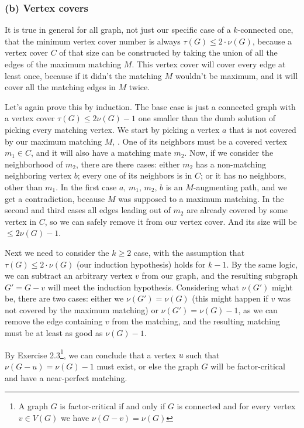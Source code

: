 \documentclass{article}
\begin{document}
  \subsubsection*{(b) Vertex covers}
  It is true in general for all graph, not just our specific case of a $k$-connected one,
  that the minimum vertex cover number is always $\tau(G) \leq 2 \cdot \nu(G)$,
  because a vertex cover $C$ of that size can be constructed by taking the union of all the edges of the maximum matching $M$.
  This vertex cover will cover every edge at least once, because if it didn't the matching $M$ wouldn't be maximum,
  and it will cover all the matching edges in $M$ twice.

  Let's again prove this by induction.
  The base case is just a connected graph with a vertex cover $\tau(G) \leq 2\nu(G) - 1$
  one smaller than the dumb solution of picking every matching vertex.
  We start by picking a vertex $a$ that is not covered by our maximum matching $M$, .
  One of its neighbors must be a covered vertex $m_1 \in C$, and it will also have a matching mate $m_2$.
  Now, if we consider the neighborhood of $m_2$, there are there cases:
  either $m_2$ has a non-matching neighboring vertex $b$;
  every one of its neighbors is in $C$;
  or it has no neighbors, other than $m_1$.
  In the first case $a,\, m_1,\, m_2,\, b$ is an $M$-augmenting path,
  and we get a contradiction, because $M$ was supposed to a maximum matching.
  In the second and third cases all edges leading out of $m_2$ are already covered by some vertex in $C$,
  so we can safely remove it from our vertex cover.
  And its size will be $\leq 2\nu(G) - 1$.

  Next we need to consider the $k \geq 2$ case, with the assumption that
  $\tau(G) \leq 2 \cdot \nu(G)$ (our induction hypothesis) holds for $k-1$.
  By the same logic, we can subtract an arbitrary vertex $v$ from our graph,
  and the resulting subgraph $G' = G - v$ will meet the induction hypothesis.
  Considering what $\nu(G')$ might be, there are two cases:
  either we $\nu(G') = \nu(G)$ (this might happen if $v$ was not covered by the maximum matching)
  or $\nu(G') = \nu(G)-1$, as we can remove the edge containing $v$ from the matching,
  and the resulting matching must be at least as good as $\nu(G)-1$.

  By Exercise 2.3\footnote{A graph $G$ is factor-critical if and only if $G$ is connected
  and for every vertex $v \in V(G)$ we have $\nu(G - v) = \nu(G)$},
  we can conclude that a vertex $u$ such that $\nu(G - u) = \nu(G)-1$ must exist,
  or else the graph $G$ will be factor-critical and have a near-perfect matching.
\end{document}
